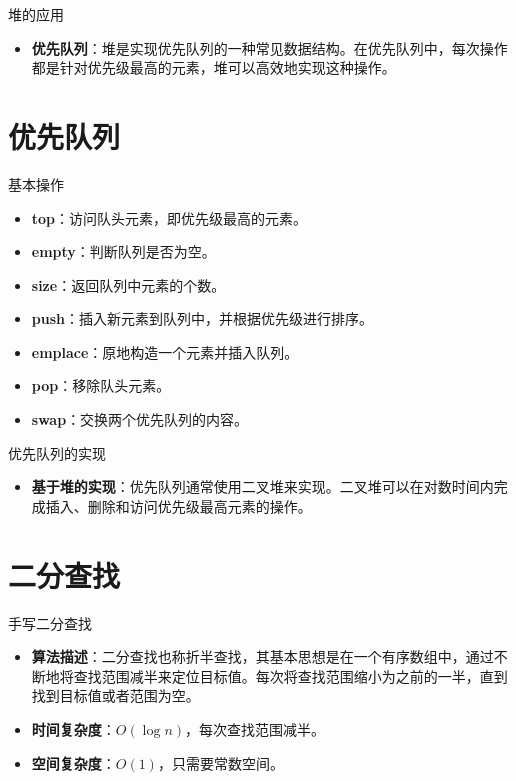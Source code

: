 \documentclass{beamer}
\begin{document}
\begin{frame}{堆的应用}
    \begin{itemize}
        \item \textbf{优先队列}：堆是实现优先队列的一种常见数据结构。在优先队列中，每次操作都是针对优先级最高的元素，堆可以高效地实现这种操作。
    \end{itemize}
\end{frame}

\section{优先队列}

\begin{frame}{基本操作}
    \begin{itemize}
        \item \textbf{top}：访问队头元素，即优先级最高的元素。
        \item \textbf{empty}：判断队列是否为空。
        \item \textbf{size}：返回队列中元素的个数。
        \item \textbf{push}：插入新元素到队列中，并根据优先级进行排序。
        \item \textbf{emplace}：原地构造一个元素并插入队列。
        \item \textbf{pop}：移除队头元素。
        \item \textbf{swap}：交换两个优先队列的内容。
    \end{itemize}
\end{frame}

\begin{frame}{优先队列的实现}
    \begin{itemize}
        \item \textbf{基于堆的实现}：优先队列通常使用二叉堆来实现。二叉堆可以在对数时间内完成插入、删除和访问优先级最高元素的操作。
    \end{itemize}
\end{frame}

\section{二分查找}

\begin{frame}{手写二分查找}
    \begin{itemize}
        \item \textbf{算法描述}：二分查找也称折半查找，其基本思想是在一个有序数组中，通过不断地将查找范围减半来定位目标值。每次将查找范围缩小为之前的一半，直到找到目标值或者范围为空。
        \item \textbf{时间复杂度}：$O(\log n)$，每次查找范围减半。
        \item \textbf{空间复杂度}：$O(1)$，只需要常数空间。
    \end{itemize}
\end{frame}
\end{document}
